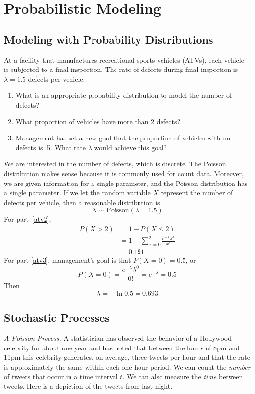 \chapter{Probabilistic Modeling}

\section{Modeling with Probability Distributions}

At a facility that manufactures recreational sports
  vehicles (ATVs), each vehicle is subjected to a final
  inspection. The rate of defects during final inspection is
  $\lambda=1.5$ defects per vehicle.
\begin{enumerate}
\item What is an appropriate probability distribution to model the
number of defects? \label{atv1}
\item What proportion of vehicles have more than 2 defects? \label{atv2}
\item Management has set a new goal that the proportion
of vehicles with no defects is .5. What rate $\lambda$ would
achieve this goal? \label{atv3}
\end{enumerate}

We are interested in the number of defects, which is discrete.
The Poisson distribution makes sense because it is commonly used
for count data. Moreover, we are given information for a single
parameter, and the Poisson distribution has a single parameter.
If we let the random variable $X$ represent the number of defects
per vehicle, then a reasonable distribution is
\[ X \sim \text{Poisson}(\lambda=1.5) \]
For part~\ref{atv2},
\begin{align*}
P(X>2) &= 1 - P(X \leq 2)\\
       &= 1 - \sum_{x=0}^2 \frac{e^{-\lambda}\lambda^x}{x!}\\
       &= 0.191
\end{align*}
For part \ref{atv3}, management's goal is that $P(X=0)=0.5$, or
\[ P(X=0) = \frac{e^{-\lambda}\lambda^0}{0!} = e^{-\lambda}=0.5 \]
Then
\[ \lambda = -\ln{0.5} = 0.693 \]

\section{Stochastic Processes}

\emph{A Poisson Process.} A statistician has observed the behavior of a Hollywood celebrity for
about one year and has noted that between the hours of 8pm and 11pm
this celebrity generates, on average, three tweets per hour and that
the rate is approximately the same within each one-hour period.  We
can count the \emph{number} of tweets that occur in a time interval
$t$. We can also measure the \emph{time} between tweets. Here is a
depiction of the tweets from last night.

